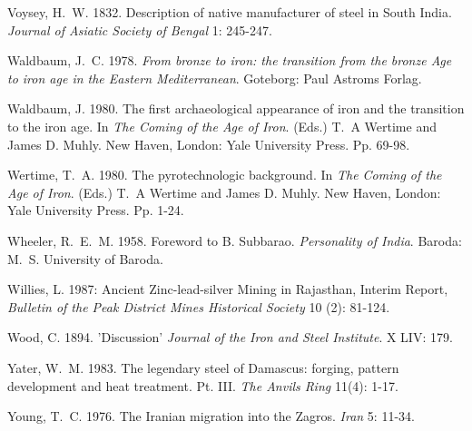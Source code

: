 \begin{thebibliography}{99}
 Voysey, H.~W. 1832. Description of native manufacturer of steel in South India. \textit{Journal of Asiatic Society of Bengal} 1: 245-247.

 Waldbaum, J.~C. 1978. \textit{From bronze to iron: the transition from the bronze Age to iron age in the Eastern Mediterranean}. Goteborg: Paul Astroms Forlag.

 Waldbaum, J. 1980. The first archaeological appearance of iron and the transition to the iron age. In \textit{The Coming of the Age of Iron}. (Eds.) T.~A Wertime and James D. Muhly. New Haven, London: Yale University Press. Pp. 69­-98.

 Wertime, T.~A. 1980. The pyrotechnologic background. In \textit{The Coming of the Age of Iron}. (Eds.) T.~A Wertime and James D. Muhly. New Haven, London: Yale University Press. Pp. 1-24.

 Wheeler, R.~E.~M. 1958. Foreword to B. Subbarao. \textit{Personality of India}. Baroda: M.~S. University of Baroda.

 Willies, L. 1987: Ancient Zinc-lead-silver Mining in Rajasthan, Interim Report, \textit{Bulletin of the Peak District Mines Historical Society} 10 (2): 81-124.

 Wood, C. 1894. 'Discussion'  \textit{Journal of the Iron and Steel Institute}.  X LIV: 179.

 Yater, W.~M. 1983. The legendary steel of Damascus: forging, pattern development and heat treatment. Pt. III. \textit{The Anvils Ring} 11(4): 1-17.

 Young, T.~C. 1976. The Iranian migration into the Zagros. \textit{Iran} 5: 11-34. 

\end{thebibliography}


\label{endchapter8}
